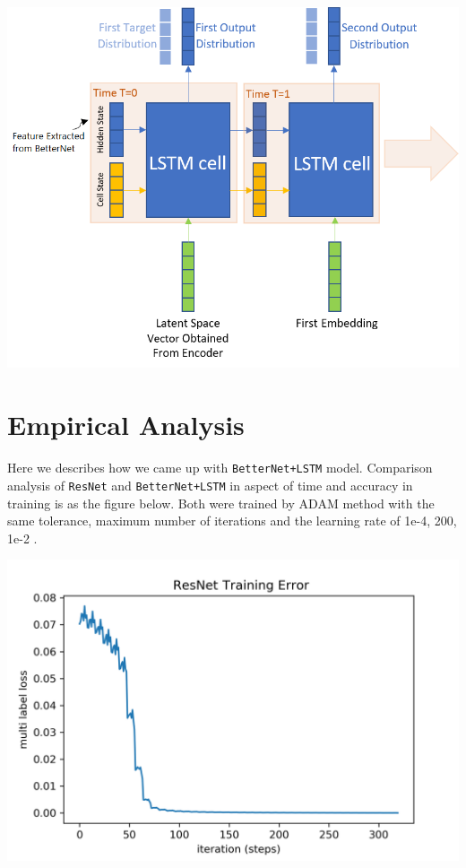 \documentclass[10pt,twocolumn, letterpaper]{article}
\begin{document}
\begin{center}
\includegraphics[width=1\linewidth]{./lstm.png}
\end{center}

\section{Empirical Analysis}

Here we describes how we came up with \texttt{BetterNet+LSTM} model. Comparison analysis of \texttt{ResNet} and \texttt{BetterNet+LSTM} in aspect of time and accuracy in training is as the figure below. Both were trained by ADAM method with the same tolerance, maximum number of iterations and the learning rate of 1e-4, 200, 1e-2 \wrt.

\begin{center}
\includegraphics[width=1\linewidth]{./ResNet.png}
\end{center}
\end{document}
